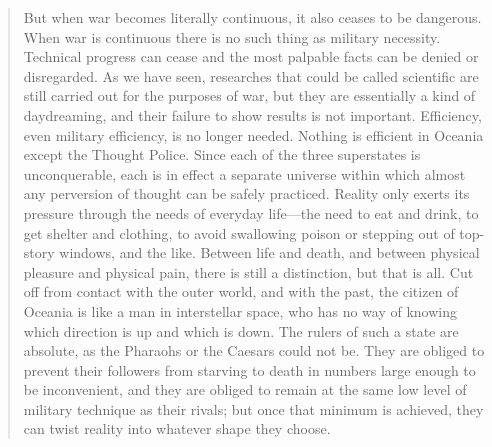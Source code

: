 \begin{quotation}
But when war becomes literally continuous, it also ceases to be
dangerous. When war is continuous there is no such thing as military
necessity. Technical progress can cease and the most palpable facts can
be denied or disregarded. As we have seen, researches that could be
called scientific are still carried out for the purposes of war, but
they are essentially a kind of daydreaming, and their failure to show
results is not important. Efficiency, even military efficiency, is no
longer needed. Nothing is efficient in Oceania except the Thought
Police. Since each of the three superstates is unconquerable, each is in
effect a separate universe within which almost any perversion of thought
can be safely practiced. Reality only exerts its pressure through the
needs of everyday life---the need to eat and drink, to get shelter and
clothing, to avoid swallowing poison or stepping out of top-story
windows, and the like. Between life and death, and between physical
pleasure and physical pain, there is still a distinction, but that is
all. Cut off from contact with the outer world, and with the past, the
citizen of Oceania is like a man in interstellar space, who has no way
of knowing which direction is up and which is down. The rulers of such a
state are absolute, as the Pharaohs or the Caesars could not be. They
are obliged to prevent their followers from starving to death in numbers
large enough to be inconvenient, and they are obliged to remain at the
same low level of military technique as their rivals; but once that
minimum is achieved, they can twist reality into whatever shape they
choose.


\end{quotation}
